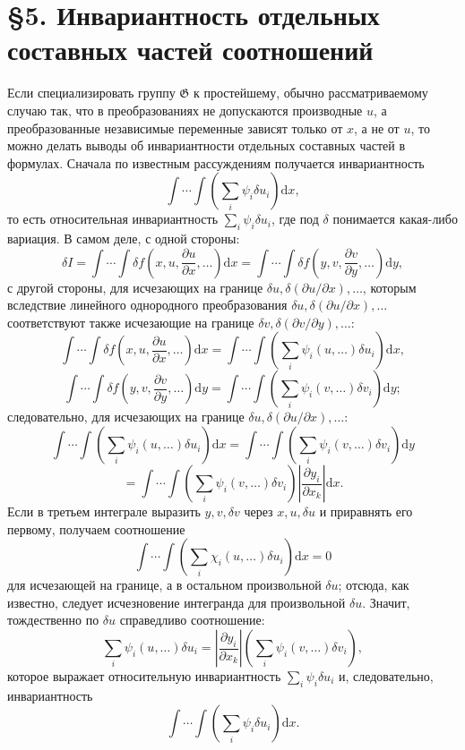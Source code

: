 \documentclass[11pt]{article}
\providecommand{\G}{\mathfrak G}
\providecommand{\p}{\partial}
\providecommand{\dd}{\mathrm d}
\begin{document}
\section*{\S{}5. Инвариантность отдельных составных частей соотношений}

Если специализировать группу \(\G\) к простейшему, обычно рассматриваемому случаю так, что в преобразованиях не допускаются производные \(u\), а преобразованные независимые переменные зависят только от \(x\), а не от \(u\), то можно делать выводы об инвариантности отдельных составных частей в формулах. Сначала по известным рассуждениям получается инвариантность
\[
\int\!\cdots\!\int\left(\sum_i\psi_i\delta u_i\right)\dd x,
\]
то есть относительная инвариантность \(\sum_i\psi_i\delta u_i\), где под \(\delta\) понимается какая-либо вариация. В самом деле, с одной стороны:
\[
\delta I
=\int\!\cdots\!\int \delta f\!\left(x,u,\frac{\p u}{\p x},\ldots\right)\dd x
=\int\!\cdots\!\int \delta f\!\left(y,v,\frac{\p v}{\p y},\ldots\right)\dd y,
\]
с другой стороны, для исчезающих на границе \(\delta u,\delta(\p u/\p x),\ldots\), которым вследствие линейного однородного преобразования \(\delta u,\delta(\p u/\p x),\ldots\) соответствуют также исчезающие на границе \(\delta v,\delta(\p v/\p y),\ldots\):
\[
\int\!\cdots\!\int \delta f\!\left(x,u,\frac{\p u}{\p x},\ldots\right)\dd x
=
\int\!\cdots\!\int\left(\sum_i\psi_i(u,\ldots)\delta u_i\right)\dd x,
\]
\[
\int\!\cdots\!\int \delta f\!\left(y,v,\frac{\p v}{\p y},\ldots\right)\dd y
=
\int\!\cdots\!\int\left(\sum_i\psi_i(v,\ldots)\delta v_i\right)\dd y;
\]
следовательно, для исчезающих на границе \(\delta u,\delta(\p u/\p x),\ldots\):
\[
\int\!\cdots\!\int\left(\sum_i\psi_i(u,\ldots)\delta u_i\right)\dd x
=
\int\!\cdots\!\int\left(\sum_i\psi_i(v,\ldots)\delta v_i\right)\dd y
\]
\[
=
\int\!\cdots\!\int\left(\sum_i\psi_i(v,\ldots)\delta v_i\right)
\left|\frac{\p y_i}{\p x_k}\right|\dd x.
\]
Если в третьем интеграле выразить \(y,v,\delta v\) через \(x,u,\delta u\) и приравнять его первому, получаем соотношение
\[
\int\!\cdots\!\int\left(\sum_i\chi_i(u,\ldots)\delta u_i\right)\dd x=0
\]
для исчезающей на границе, а в остальном произвольной \(\delta u\); отсюда, как известно, следует исчезновение интегранда для произвольной \(\delta u\). Значит, тождественно по \(\delta u\) справедливо соотношение:
\[
\sum_i\psi_i(u,\ldots)\delta u_i
=
\left|\frac{\p y_i}{\p x_k}\right|
\left(\sum_i\psi_i(v,\ldots)\delta v_i\right),
\]
которое выражает относительную инвариантность \(\sum_i\psi_i\delta u_i\) и, следовательно, инвариантность
\[
\int\!\cdots\!\int\left(\sum_i\psi_i\delta u_i\right)\dd x.
\]
\end{document}
